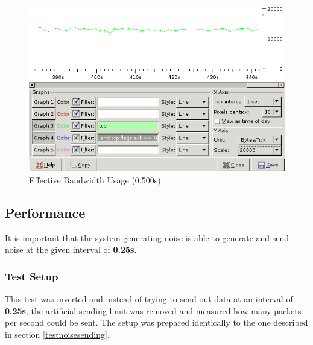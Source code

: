 \begin{figure}[htbp]
\caption{Effective Bandwidth Usage (0.500s)}
\label{bw0500}
\centering
\includegraphics[scale=0.5]{bandwidth-0500.png}
\end{figure}
\subsection{Performance}
It is important that the system generating noise is able to generate 
and send noise at the given interval of \textbf{0.25s}.
\subsubsection{Test Setup}
This test was inverted and instead of trying to send out data
at an interval of \textbf{0.25s}, the artificial sending limit was removed
and measured how many packets per second could be sent.
The setup was prepared identically to the one described
in section \ref{testnoisesending}. 
